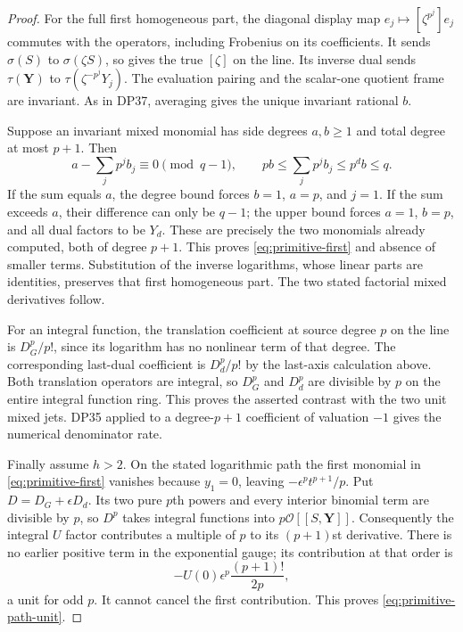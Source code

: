 \documentclass[11pt,a4paper]{article}
\theoremstyle{definition}\newtheorem{remark}[theorem]{Remark}
\begin{document}
\begin{proof}
For the full first homogeneous part, the diagonal display map $e_j\mapsto[\zeta^{p^j}]e_j$ commutes with the operators, including Frobenius on its coefficients. It sends $\sigma(S)$ to $\sigma(\zeta S)$, so gives the true $[\zeta]$ on the line. Its inverse dual sends $\tau(\mathbf Y)$ to $\tau(\zeta^{-p^j}Y_j)$. The evaluation pairing and the scalar-one quotient frame are invariant. As in DP37, averaging gives the unique invariant rational $b$.

Suppose an invariant mixed monomial has side degrees $a,b\ge1$ and total degree at most $p+1$. Then
\[
 a-\sum_jp^jb_j\equiv0\pmod{q-1},\qquad
 pb\le\sum_jp^jb_j\le p^db\le q.
\]
If the sum equals $a$, the degree bound forces $b=1$, $a=p$, and $j=1$. If the sum exceeds $a$, their difference can only be $q-1$; the upper bound forces $a=1$, $b=p$, and all dual factors to be $Y_d$. These are precisely the two monomials already computed, both of degree $p+1$. This proves \eqref{eq:primitive-first} and absence of smaller terms. Substitution of the inverse logarithms, whose linear parts are identities, preserves that first homogeneous part. The two stated factorial mixed derivatives follow.

For an integral function, the translation coefficient at source degree $p$ on the line is $D_G^p/p!$, since its logarithm has no nonlinear term of that degree. The corresponding last-dual coefficient is $D_d^p/p!$ by the last-axis calculation above. Both translation operators are integral, so $D_G^p$ and $D_d^p$ are divisible by $p$ on the entire integral function ring. This proves the asserted contrast with the two unit mixed jets. DP35 applied to a degree-$p+1$ coefficient of valuation $-1$ gives the numerical denominator rate.

Finally assume $h>2$. On the stated logarithmic path the first monomial in \eqref{eq:primitive-first} vanishes because $y_1=0$, leaving $-\epsilon^pt^{p+1}/p$. Put $D=D_G+\epsilon D_d$. Its two pure $p$th powers and every interior binomial term are divisible by $p$, so $D^p$ takes integral functions into $p\mathcal O[[S,\mathbf Y]]$. Consequently the integral $U$ factor contributes a multiple of $p$ to its $(p+1)$st derivative. There is no earlier positive term in the exponential gauge; its contribution at that order is
\[
 -U(0)\epsilon^p\frac{(p+1)!}{2p},
\]
a unit for odd $p$. It cannot cancel the first contribution. This proves \eqref{eq:primitive-path-unit}.
\end{proof}
\end{document}
